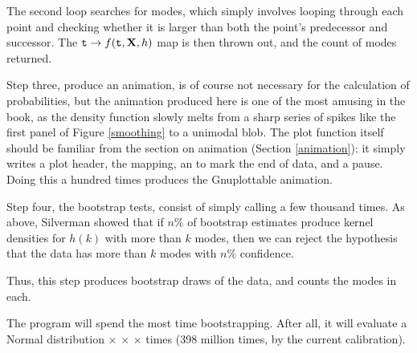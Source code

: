 The second loop searches for modes, which simply involves looping
through each point and checking whether it is larger than both the
point's predecessor and successor.  The ${\bf\tt t} \to f({\bf\tt t}, {\bf X}, h)$
map is then thrown out, and the count of modes returned.

Step three, produce an animation, is of course not necessary for the
calculation of probabilities, but the animation produced here is one of
the most amusing in the book, as the density function slowly
melts from a sharp series of spikes like the first panel of Figure
\ref{smoothing} to a unimodal blob. The plot function itself should be
familiar from the section on animation (Section \ref{animation}): it
simply writes a  plot header, the mapping, an  to mark the
end of data, and a pause. Doing this a hundred times produces the
Gnuplottable animation.

Step four, the bootstrap tests, consist of simply calling
 a few thousand times. As above, Silverman showed that
if $n\%$ of bootstrap estimates produce kernel densities for $h(k)$
with more than $k$ modes, then we can reject the hypothesis that the
data has more than $k$ modes with $n\%$ confidence.

Thus, this step produces  bootstrap draws of the
data, and counts the modes in each. 

The program will spend the most time bootstrapping. After all, it
will evaluate a Normal distribution  $\times$
 $\times$  $\times$  times
(398 million times, by the current calibration).


    \setlistdefaults
